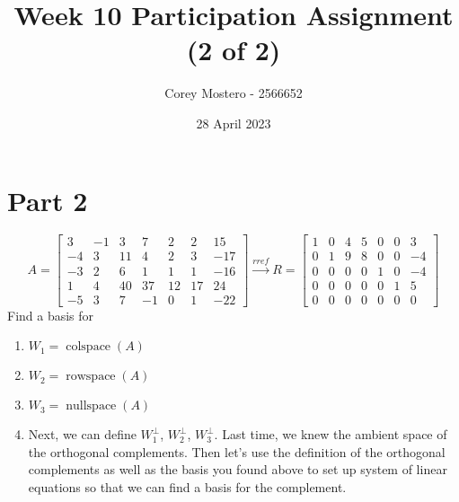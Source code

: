 \documentclass{article}
\title{Week 10 Participation Assignment (2 of 2)}
\author{Corey Mostero - 2566652}
\date{28 April 2023}
\DeclareMathOperator{\colspace}{colspace}
\DeclareMathOperator{\rowspace}{rowspace}
\DeclareMathOperator{\nullspace}{nullspace}
\begin{document}
\newcommand{\hr}{\par\noindent\rule{\textwidth}{0.4pt}}

\newcommand{\bc}[1]{
	\begin{equation*}
		\begin{boxed}
			{#1}
		\end{boxed}
	\end{equation*}
}

\newcommand{\cond}[2]{
	\ifmmode
		{#1} \quad {#2}
	\else
		$$ {#1} \quad {#2} $$
	\fi
}

\maketitle
\newpage

\tableofcontents

\section{Part 2}

\begin{equation*}
	A = \begin{bmatrix}
		3 & -1 & 3 & 7 & 2 & 2 & 15 \\
		-4 & 3 & 11 & 4 & 2 & 3 & -17 \\
		-3 & 2 & 6 & 1 & 1 & 1 & -16 \\
		1 & 4 & 40 & 37 & 12 & 17 & 24 \\
		-5 & 3 & 7 & -1 & 0 & 1 & -22
	\end{bmatrix} \xrightarrow{rref}
	R = \begin{bmatrix}
		1 & 0 & 4 & 5 & 0 & 0 & 3 \\
		0 & 1 & 9 & 8 & 0 & 0 & -4 \\
		0 & 0 & 0 & 0 & 1 & 0 & -4 \\
		0 & 0 & 0 & 0 & 0 & 1 & 5 \\
		0 & 0 & 0 & 0 & 0 & 0 & 0
	\end{bmatrix}
\end{equation*}
Find a basis for
\begin{enumerate}[label = \textbf{\arabic*).}]
	\item $ W_1 = \colspace(A) $
	\item $ W_2 = \rowspace(A) $
	\item $ W_3 = \nullspace(A) $
	\item Next, we can define $ W_1^\perp $, $ W_2^\perp $, $ W_3^\perp $. Last time, we knew the ambient space of the orthogonal complements. Then let's use the definition of the orthogonal complements as well as the basis you found above to set up system of linear equations so that we can find a basis for the complement.
\end{enumerate}
\end{document}

